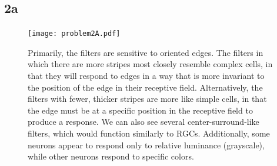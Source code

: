 \documentclass[]{article}
\begin{document}
\subsection*{2a}
\begin{figure}[H]
    \centering
    \texttt{[image: problem2A.pdf]}
    \caption{Primarily, the filters are sensitive to oriented edges. The filters in which there are more stripes most closely resemble complex cells, in that they will respond to edges in a way that is more invariant to the position of the edge in their receptive field. Alternatively, the filters with fewer, thicker stripes are more like simple cells, in that the edge must be at a specific position in the receptive field to produce a response. We can also see several center-surround-like filters, which would function similarly to RGCs. Additionally, some neurons appear to respond only to relative luminance (grayscale), while other neurons respond to specific colors.}
    \label{fig:my_label}
\end{figure}
\end{document}
